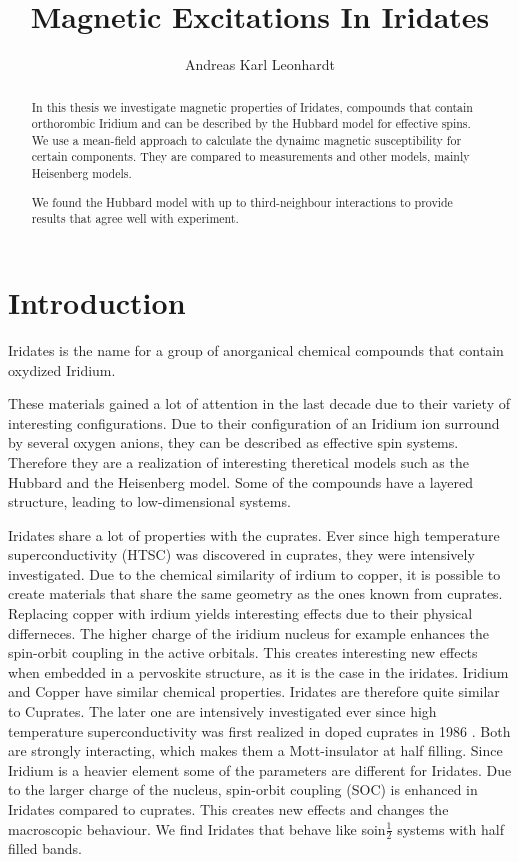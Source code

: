 \documentclass[a4paper,12pt]{report}
\title{Magnetic Excitations In Iridates}
\author{Andreas Karl Leonhardt}
\begin{document}

\begin{abstract}
In this thesis we investigate magnetic properties of Iridates, 
compounds that contain orthorombic Iridium and can be described by the Hubbard model for effective spins.
We use a mean-field approach to calculate the dynaimc magnetic susceptibility for certain components.
They are compared to measurements and other models, mainly Heisenberg models. 

We found the Hubbard model with up to third-neighbour interactions to provide results that agree well with experiment.
\end{abstract}


\tableofcontents

\chapter{Introduction}

Iridates is the name for a group of anorganical chemical compounds that contain oxydized Iridium.

These materials gained a lot of attention in the last decade due to their variety of interesting configurations.
Due to their configuration of an Iridium ion surround by several oxygen anions, they can be described as effective spin systems.
Therefore they are a realization of interesting theretical models such as the Hubbard and the Heisenberg model.
Some of the compounds have a layered structure, leading to low-dimensional systems.


Iridates share a lot of properties with the cuprates. 
Ever since high temperature superconductivity (HTSC) was discovered in cuprates, 
they were intensively investigated. 
Due to the chemical similarity of irdium to copper, it is possible to create materials that share the same geometry as the ones known from cuprates.
Replacing copper with irdium yields interesting effects due to their physical differneces.
The higher charge of the iridium nucleus for example enhances the spin-orbit coupling in the active orbitals.
This creates interesting new effects when embedded in a pervoskite structure, as it is the case in the iridates.
%
%
Iridium and Copper have similar chemical properties. 
Iridates are therefore quite similar to Cuprates. 
The later one are intensively investigated ever since high temperature superconductivity was first realized in doped cuprates in 1986 \cite{}.
Both are strongly interacting, which makes them a Mott-insulator at half filling.
Since Iridium is a heavier element some of the parameters are different for Iridates. 
Due to the larger charge of the nucleus, spin-orbit coupling (SOC) is enhanced in Iridates compared to cuprates.
This creates new effects and changes the macroscopic behaviour. 
We find Iridates that behave like soin$\frac12$ systems with half filled bands. 
\end{document}
